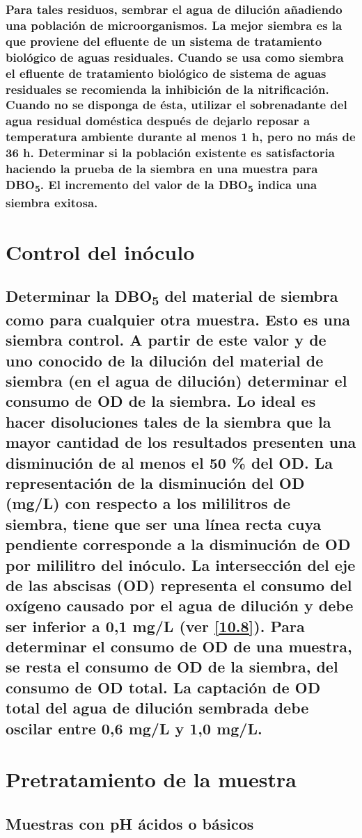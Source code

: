 \documentclass[spanish,12pt,letterpaper,titlepage]{article}
\theoremstyle{definition}
\begin{document}
	\subsubsection{Para tales residuos, sembrar el agua de dilución añadiendo una población de microorganismos. La mejor siembra es la que proviene del efluente de un sistema de tratamiento biológico de aguas residuales. Cuando se usa como siembra el efluente de tratamiento biológico de sistema de aguas residuales se recomienda la inhibición de la nitrificación. Cuando no se disponga de ésta, utilizar el sobrenadante del agua residual doméstica después de dejarlo reposar a temperatura ambiente durante al menos 1 h, pero no más de 36 h. Determinar si la población existente es satisfactoria haciendo la prueba de la siembra en una muestra para DBO\textsubscript{5}. El incremento del valor de la DBO\textsubscript{5} indica una siembra exitosa.}\label{10.4.1.2}
	\section{Control del inóculo}\label{10.5}
	\subsection{Determinar la DBO\textsubscript{5} del material de siembra como para cualquier otra muestra. Esto es una siembra control. A partir de este valor y de uno conocido de la dilución del material de siembra (en el agua de dilución) determinar el consumo de OD de la siembra. Lo ideal es hacer disoluciones tales de la siembra que la mayor cantidad de los resultados presenten una disminución de al menos el 50 \% del OD. La representación de la disminución del OD (mg/L) con respecto a los mililitros de siembra, tiene que ser una línea recta cuya pendiente corresponde a la disminución de OD por mililitro del inóculo. La intersección del eje de las abscisas (OD) representa el consumo del oxígeno causado por el agua de dilución y debe ser inferior a 0,1 mg/L (ver \ref{10.8}). Para determinar el consumo de OD de una muestra, se resta el consumo de OD de la siembra, del consumo de OD total. La captación de OD total del agua de dilución sembrada debe oscilar entre 0,6 mg/L y 1,0 mg/L.}\label{10.5.1}
	\section{Pretratamiento de la muestra}\label{10.6}
	\subsection{Muestras con pH ácidos o básicos}\label{10.6.1}
\end{document}
